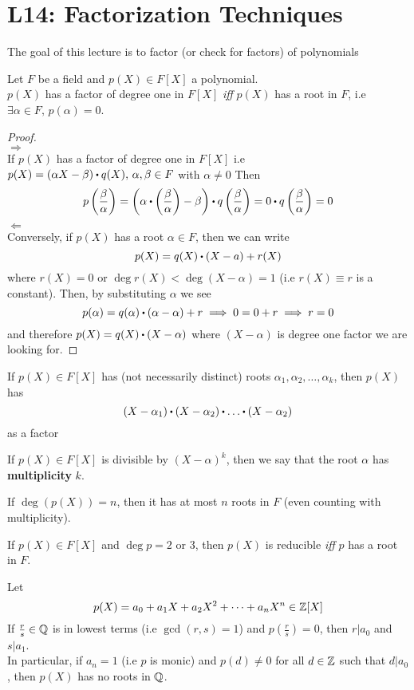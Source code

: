 \documentclass[../Main.tex]{subfiles}
\begin{document}
\chapter{L14: Factorization Techniques}
The goal of this lecture is to factor (or check for factors) of polynomials

\begin{prop}
	Let $F$ be a field and $p(X)\in F[X]$ a polynomial.\\
	$p(X)$ has a factor of degree one in $F[X]$ \textit{iff} $p(X)$ has a root in $F$, i.e $\exists \alpha \in F,\, p(\alpha)=0$.
\end{prop}
\begin{proof}~\\
	$\Longrightarrow$\\
	If $p(X)$ has a factor of degree one in $F[X]$ i.e $p(X)=(\alpha X-\beta) \rdot q(X),\, \alpha,\beta \in F$ with $\alpha\ne 0$ Then
	\[p\left(\frac{\beta}{\alpha}\right)=\left(\alpha \rdot \left(\frac{\beta}{\alpha}\right) - \beta \right)\rdot q\left(\frac{\beta}{\alpha}\right) = 0 \rdot  q\left(\frac{\beta}{\alpha}\right)=0\]
	$\Longleftarrow$\\
	Conversely, if $p(X)$ has a root $\alpha \in F$, then we can write 
	\[p(X)=q(X)\rdot (X-a)+r(X)\]
	where $r(X)=0$ or $\deg r(X)< \deg (X-\alpha) =1$ (i.e $r(X)\equiv r$ is a constant). Then, by substituting $\alpha$ we see
	\[p(\alpha)=q(\alpha)\rdot (\alpha-\alpha)+r \implies 0 = 0 +r \implies r=0\]
	and therefore $p(X) = q(X)\rdot (X-\alpha)$ where $(X-\alpha)$ is degree one factor we are looking for.
\end{proof}
\begin{crl}
	If $p(X)\in F[X]$ has (not necessarily distinct) roots $\alpha_1,\alpha_2,\dots,\alpha_k$, then $p(X)$ has
	\[(X-\alpha_1)\rdot (X-\alpha_2)\rdot \dots\rdot (X-\alpha_2)\]
	as a factor
\end{crl}
\begin{dfn}[title=Multiplicity]
	If $p(X)\in F[X]$ is divisible by $(X-\alpha)^k$, then we say that the root $\alpha$ has \textbf{multiplicity} $k$.
\end{dfn}
\begin{crl}
	If $\deg(p(X))=n$, then it has at most $n$ roots in $F$ (even counting with multiplicity).
\end{crl}
\begin{crl}
	If $p(X)\in F[X]$ and $\deg p = 2$ or $3$, then $p(X)$ is reducible \textit{iff} $p$ has a root in $F$.
\end{crl}
\begin{prop}
	Let 
	\[p(X)=a_0+a_1X+a_2X^2+\dots+a_nX^n\in \mathbb{Z}[X]\]
	If $\frac{r}{s}\in \mathbb{Q}$ is in lowest terms (i.e $\gcd(r,s)=1$) and $p\left(\frac{r}{s}\right)=0$, then $r|a_0$ and $s|a_1$.\\
	In particular, if $a_n=1$ (i.e $p$ is monic) and $p(d)\ne 0$ for all $d \in \mathbb{Z}$ such that $d|a_0$, then $p(X)$ has no roots in $\mathbb{Q}$.
\end{prop}
\end{document}
